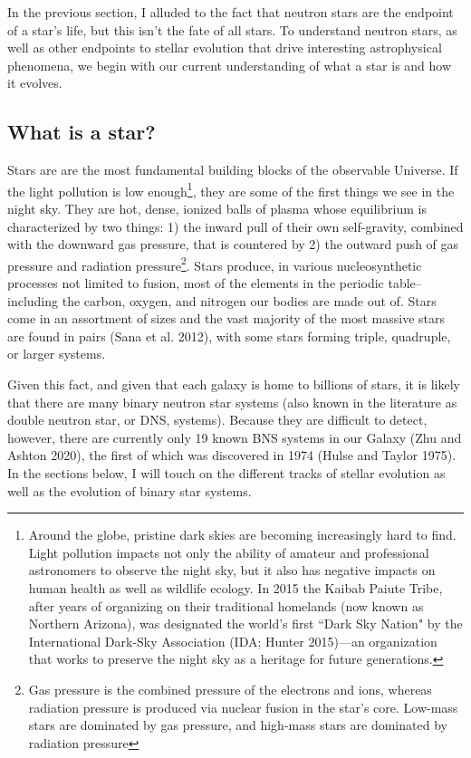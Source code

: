 \documentclass[1.5,11pt]{beavtex}
\begin{document}
In the previous section, I alluded to the fact that neutron stars are the endpoint of a star's life, but this isn't the fate of all stars. To understand neutron stars, as well as other endpoints to stellar evolution that drive interesting astrophysical phenomena, we begin with our current understanding of what a star is and how it evolves.  

\subsection{What is a star?}
\label{ch:Astro theory ssec:what is a star}

Stars are are the most fundamental building blocks of the observable Universe. If the light pollution is low enough\footnote{\selectfont Around the globe, pristine dark skies are becoming increasingly hard to find. Light pollution impacts not only the ability of amateur and professional astronomers to observe the night sky, but it also has negative impacts on human health as well as wildlife ecology. In 2015 the Kaibab Paiute Tribe, after years of organizing on their traditional homelands (now known as Northern Arizona), was designated the world's first ``Dark Sky Nation" by the International Dark-Sky Association (IDA; Hunter 2015)---an organization that works to preserve the night sky as a heritage for future generations.}, they are some of the first things we see in the night sky. They are hot, dense, ionized balls of plasma whose equilibrium is characterized by two things: 1) the inward pull of their own self-gravity, combined with the downward gas pressure, that is countered by 2) the outward push of gas pressure and radiation pressure\footnote{\selectfont Gas pressure is the combined pressure of the electrons and ions, whereas radiation pressure is produced via nuclear fusion in the star's core. Low-mass stars are dominated by gas pressure, and high-mass stars are dominated by radiation pressure}. Stars produce, in various nucleosynthetic processes not limited to fusion, most of the elements in the periodic table–including the carbon, oxygen, and nitrogen our bodies are made out of. Stars come in an assortment of sizes and the vast majority of the most massive stars are found in pairs (Sana et al. 2012), with some stars forming triple, quadruple, or larger systems.

Given this fact, and given that each galaxy is home to billions of stars, it is likely that there are many binary neutron star systems (also known in the literature as double neutron star, or DNS, systems). Because they are difficult to detect, however, there are currently only 19 known BNS systems in our Galaxy (Zhu and Ashton 2020), the first of which was discovered in 1974 (Hulse and Taylor 1975). In the sections below, I will touch on the different tracks of stellar evolution as well as the evolution of binary star systems.
\end{document}

